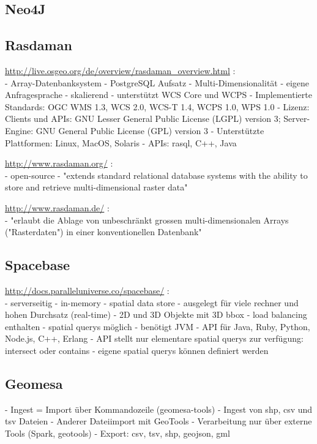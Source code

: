 \subsection{Neo4J}

\newpage

\subsection{Rasdaman}

\url{http://live.osgeo.org/de/overview/rasdaman_overview.html} :\\
- Array-Datenbanksystem
- PostgreSQL Aufsatz
- Multi-Dimensionalität
- eigene Anfragesprache
- skalierend
- unterstützt WCS Core und WCPS
- Implementierte Standards: OGC WMS 1.3, WCS 2.0, WCS-T 1.4, WCPS 1.0, WPS 1.0
- Lizenz: Clients und APIs: GNU Lesser General Public License (LGPL) version 3; Server-Engine: GNU General Public License (GPL) version 3
- Unterstützte Plattformen: Linux, MacOS, Solaris
- APIs: rasql, C++, Java


\url{http://www.rasdaman.org/} :\\
- open-source
- "extends standard relational database systems with the ability to store and retrieve multi-dimensional raster data"


\url{http://www.rasdaman.de/} :\\
- "erlaubt die Ablage von unbeschränkt grossen multi-dimensionalen Arrays ("Rasterdaten") in einer konventionellen Datenbank"


\subsection{Spacebase}

\url{http://docs.paralleluniverse.co/spacebase/} :\\
- serverseitig
- in-memory
- spatial data store
- ausgelegt für viele rechner und hohen Durchsatz (real-time)
- 2D und 3D Objekte mit 3D bbox
- load balancing enthalten
- spatial querys möglich
- benötigt JVM
- API für Java, Ruby, Python, Node.js, C++, Erlang
- API stellt nur elementare spatial querys zur verfügung: intersect oder contains
- eigene spatial querys können definiert werden

\subsection{Geomesa}

- Ingest = Import über Kommandozeile (geomesa-tools)
- Ingest von shp, csv und tsv Dateien
- Anderer Dateiimport mit GeoTools
- Verarbeitung nur über externe Tools (Spark, geotools)
- Export: csv, tsv, shp, geojson, gml

